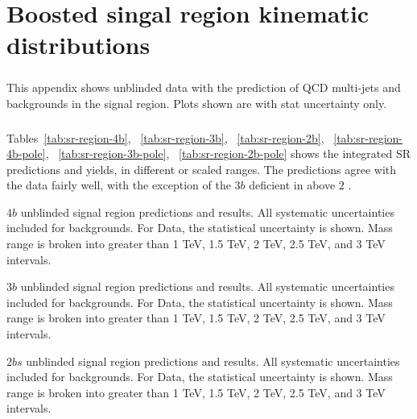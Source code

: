 \chapter{Boosted singal region kinematic distributions}
\label{AppendixSR}

\paragraph{}
This appendix shows unblinded data with the prediction of QCD multi-jets and \ttbar~ backgrounds in the signal region. Plots shown are with stat uncertainty only.

\paragraph{}
Tables~\ref{tab:sr-region-4b}, ~\ref{tab:sr-region-3b}, ~\ref{tab:sr-region-2b}, ~\ref{tab:sr-region-4b-pole}, ~\ref{tab:sr-region-3b-pole}, ~\ref{tab:sr-region-2b-pole} shows the integrated SR predictions and yields, in different \mtwoJ or scaled \mtwoJ ranges. The predictions agree with the data fairly well, with the exception of the $3b$ deficient in \mtwoJ above $2$ \TeV.

\begin{table}[htbp!]
\scriptsize
\begin{center}

\caption{$4b$ unblinded signal region predictions and results. All systematic uncertainties included for backgrounds. For Data, the statistical uncertainty is shown. Mass range is broken into greater than 1 TeV, 1.5 TeV, 2 TeV, 2.5 TeV, and 3 TeV intervals.}
\label{tab:sr-region-4b}
\end{center}
\end{table}

\begin{table}[htbp!]
\scriptsize
\begin{center}

\caption{$3b$ unblinded signal region predictions and results. All systematic uncertainties included for backgrounds. For Data, the statistical uncertainty is shown. Mass range is broken into greater than 1 TeV, 1.5 TeV, 2 TeV, 2.5 TeV, and 3 TeV intervals.}
\label{tab:sr-region-3b}
\end{center}
\end{table}

\begin{table}[htbp!]
\scriptsize
\begin{center}

\caption{$2bs$ unblinded signal region predictions and results. All systematic uncertainties included for backgrounds. For Data, the statistical uncertainty is shown. Mass range is broken into greater than 1 TeV, 1.5 TeV, 2 TeV, 2.5 TeV, and 3 TeV intervals.}
\label{tab:sr-region-2b}
\end{center}
\end{table}


